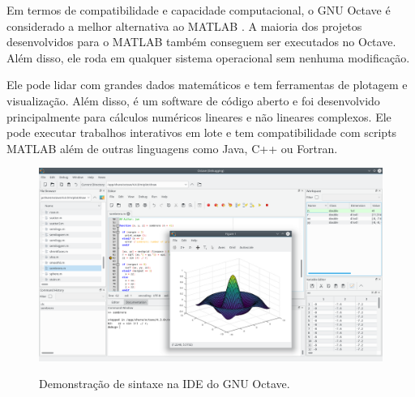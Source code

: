 Em termos de compatibilidade e capacidade computacional, o GNU Octave é considerado a melhor alternativa ao MATLAB \cite{matlab-alts}. A maioria dos projetos desenvolvidos para o MATLAB também conseguem ser executados no Octave. Além disso, ele roda em qualquer sistema operacional sem nenhuma modificação. 

Ele pode lidar com grandes dados matemáticos e tem ferramentas de plotagem e visualização. Além disso, é um software de código aberto e foi desenvolvido principalmente para cálculos numéricos lineares e não lineares complexos. Ele pode executar trabalhos interativos em lote e tem compatibilidade com scripts MATLAB além de outras linguagens como Java, C++ ou Fortran.

\begin{figure}[H]
	\caption{\small Demonstração de sintaxe na IDE do GNU Octave.}
	\centering
	\includegraphics[width=\textwidth]{figs/octave-ide.png}
	\label{f.matlab-syntax}
\end{figure}